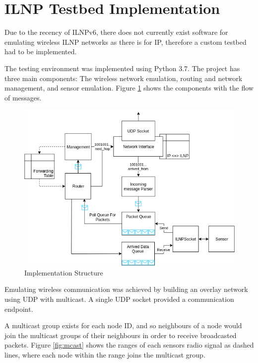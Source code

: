\documentclass[12pt]{article}
\begin{document}
\FloatBarrier
\pagebreak
\section{ILNP Testbed Implementation}

Due to the recency of ILNPv6, there does not currently exist software for emulating wireless ILNP networks as there is for IP, therefore a custom testbed had to be implemented.  

The testing environment was implemented using Python 3.7. The project has three main components: The wireless network emulation, routing and network management, and sensor emulation. Figure \ref{fig:struc} shows the components with the flow of messages.

\begin{figure}[!ht]
	\centering
	\includegraphics[width=\linewidth]{images/struc}
	\caption{Implementation Structure}
	\label{fig:struc}
\end{figure}

Emulating wireless communication was achieved by building an overlay network using UDP with multicast. A single UDP socket provided a communication endpoint.

A multicast group exists for each node ID, and so neighbours of a node would join the multicast groups of their neighbours in order to receive broadcasted packets. Figure \ref{fig:mcast} shows the ranges of each sensors radio signal as dashed lines, where each node within the range joins the multicast group.
\end{document}
